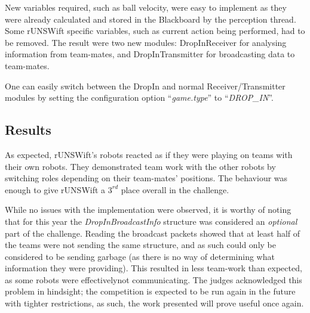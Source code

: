 New variables required, such as ball velocity, were easy to implement as they were already calculated and stored in the Blackboard by the perception thread. Some rUNSWift specific variables, such as current action being performed, had to be removed. The result were two new modules: DropInReceiver for analysing information from team-mates, and DropInTransmitter for broadcasting data to team-mates.

One can easily switch between the DropIn and normal Receiver/Transmitter modules by setting the configuration option ``\textit{game.type}'' to ``\textit{DROP\_IN}''.

\subsection{Results}

As expected, rUNSWift's robots reacted as if they were playing on teams with their own robots. They demonstrated team work with the other robots by switching roles depending on their team-mates' positions. The behaviour was enough to give rUNSWift a $3^{rd}$ place overall in the challenge.

While no issues with the implementation were observed, it is worthy of noting that for this year the \textit{DropInBroadcastInfo} structure was considered an \textit{optional} part of the challenge. Reading the broadcast packets showed that at least half of the teams were not sending the same structure, and as such could only be considered to be sending garbage (as there is no way of determining what information they were providing). This resulted in less team-work than expected, as some robots were effectivelynot communicating. The judges acknowledged this problem in hindsight; the competition is expected to be run again in the future with tighter restrictions, as such, the work presented will prove useful once again.

